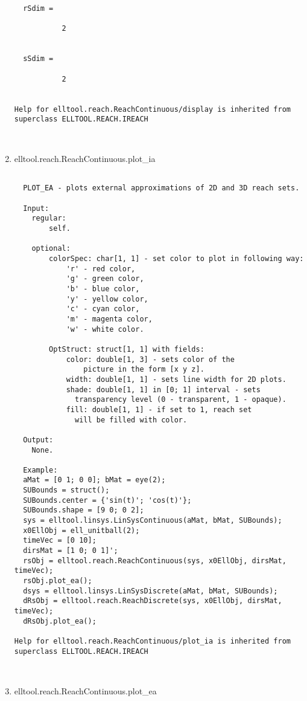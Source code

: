 \begin{enumerate}
\begin{lstlisting}
  rSdim =

           2


  sSdim =

           2


Help for elltool.reach.ReachContinuous/display is inherited from superclass ELLTOOL.REACH.IREACH



\end{lstlisting}
\fontfamily{\familydefault}
\selectfont
\item {elltool.reach.ReachContinuous.plot\_ia}
\selectfont
\begin{lstlisting}

  PLOT_EA - plots external approximations of 2D and 3D reach sets.

  Input:
    regular:
        self.

    optional:
        colorSpec: char[1, 1] - set color to plot in following way:
            'r' - red color,
            'g' - green color,
            'b' - blue color,
            'y' - yellow color,
            'c' - cyan color,
            'm' - magenta color,
            'w' - white color.

        OptStruct: struct[1, 1] with fields:
            color: double[1, 3] - sets color of the
                picture in the form [x y z].
            width: double[1, 1] - sets line width for 2D plots.
            shade: double[1, 1] in [0; 1] interval - sets
              transparency level (0 - transparent, 1 - opaque).
            fill: double[1, 1] - if set to 1, reach set
              will be filled with color.

  Output:
    None.

  Example:
  aMat = [0 1; 0 0]; bMat = eye(2);
  SUBounds = struct();
  SUBounds.center = {'sin(t)'; 'cos(t)'};
  SUBounds.shape = [9 0; 0 2];
  sys = elltool.linsys.LinSysContinuous(aMat, bMat, SUBounds);
  x0EllObj = ell_unitball(2);
  timeVec = [0 10];
  dirsMat = [1 0; 0 1]';
  rsObj = elltool.reach.ReachContinuous(sys, x0EllObj, dirsMat, timeVec);
  rsObj.plot_ea();
  dsys = elltool.linsys.LinSysDiscrete(aMat, bMat, SUBounds);
  dRsObj = elltool.reach.ReachDiscrete(sys, x0EllObj, dirsMat, timeVec);
  dRsObj.plot_ea();

Help for elltool.reach.ReachContinuous/plot_ia is inherited from superclass ELLTOOL.REACH.IREACH



\end{lstlisting}
\fontfamily{\familydefault}
\selectfont
\item {elltool.reach.ReachContinuous.plot\_ea}
\selectfont
\begin{lstlisting}


\end{lstlisting}
\end{enumerate}
